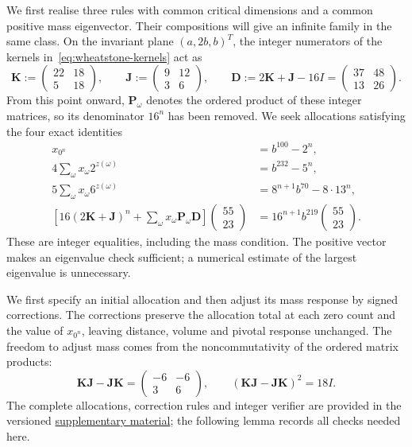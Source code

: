 \documentclass[scheme=plain,11pt]{ctexart}
\theoremstyle{definition}
\theoremstyle{remark}
\begin{document}
We first realise three rules with common critical dimensions and a common positive mass eigenvector. Their compositions will give an infinite family in the same class.
On the invariant plane $(a,2b,b)^T$, the integer numerators of the kernels in~\eqref{eq:wheatstone-kernels} act as
\[
 \mathbf K:=\begin{pmatrix}22&18\\5&18\end{pmatrix},\qquad
 \mathbf J:=\begin{pmatrix}9&12\\3&6\end{pmatrix},\qquad
 \mathbf D:=2\mathbf K+\mathbf J-16I
 =\begin{pmatrix}37&48\\13&26\end{pmatrix}.
\]
From this point onward, $\mathbf P_\omega$ denotes the ordered product of these integer matrices, so its denominator $16^n$ has been removed.
We seek allocations satisfying the four exact identities
\begin{align}
 x_{0^n}&=b^{100}-2^n,\label{eq:certificate-length}\\
 4\sum_\omega x_\omega2^{z(\omega)}&=b^{232}-5^n,\label{eq:certificate-volume}\\
 5\sum_\omega x_\omega6^{z(\omega)}&=8^{n+1}b^{70}-8\cdot13^n,\label{eq:certificate-thermal}\\
 \left[16(2\mathbf K+\mathbf J)^n+
 \sum_\omega x_\omega\mathbf P_\omega\mathbf D\right]
 \begin{pmatrix}55\\23\end{pmatrix}
 &=16^{n+1}b^{219}\begin{pmatrix}55\\23\end{pmatrix}.
 \label{eq:certificate-mass}
\end{align}
These are integer equalities, including the mass condition. The positive vector makes an eigenvalue check sufficient; a numerical estimate of the largest eigenvalue is unnecessary.

We first specify an initial allocation and then adjust its mass response by signed corrections.
The corrections preserve the allocation total at each zero count and the value of $x_{0^n}$, leaving distance, volume and pivotal response unchanged.
The freedom to adjust mass comes from the noncommutativity of the ordered matrix products:
\[
 \mathbf K\mathbf J-\mathbf J\mathbf K
 =\begin{pmatrix}-6&-6\\3&6\end{pmatrix},\qquad
 (\mathbf K\mathbf J-\mathbf J\mathbf K)^2=18I.
\]
The complete allocations, correction rules and integer verifier are provided in the versioned
\href{https://github.com/Nero-17/LEAN-Formalisation-IGS-Bernoulli-percolation-universality-class/tree/de5c6e9c2d6f025665f20a5ee2c54ba373f28741/supplementary/section5}{supplementary material}; the following lemma records all checks needed here.
\end{document}
